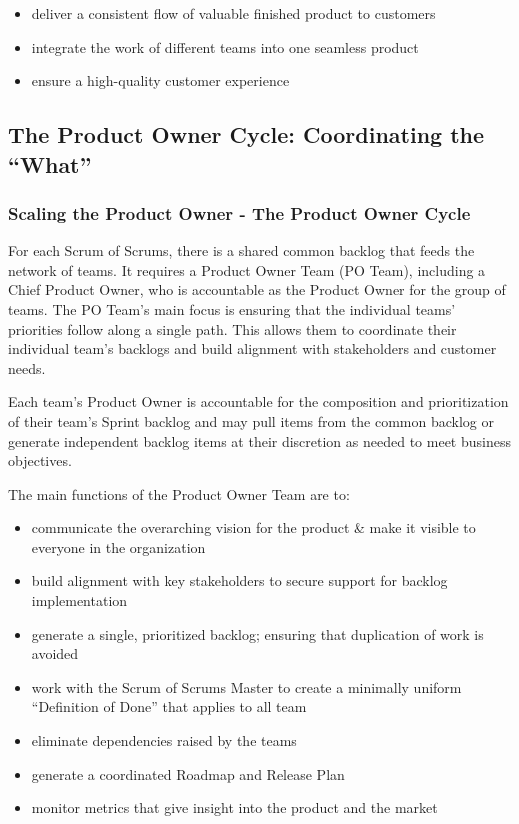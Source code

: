 \documentclass[12pt,a4paper,parskip=full]{scrartcl}
\begin{document}
\begin{itemize}
\itemsep1pt\parskip0pt
\item
  deliver a consistent flow of valuable finished product to customers
\item
  integrate the work of different teams into one seamless product
\item
  ensure a high-quality customer experience
\end{itemize}

\subsection{The Product Owner Cycle: Coordinating the
``What''}\label{The-product-owner-cycle}

\subsubsection{Scaling the Product Owner - The Product Owner
Cycle}\label{Scaling-the-product-owner}

For each Scrum of Scrums, there is a shared common backlog that feeds the network of teams. It requires a Product Owner Team (PO Team), including a Chief Product Owner, who is accountable as the Product Owner for the group of teams. The PO Team's main focus is ensuring that the individual teams' priorities follow along a single path. This allows them to coordinate their individual team's backlogs and build alignment with stakeholders and customer needs.


Each team's Product Owner is accountable for the composition and prioritization of their team's Sprint backlog and may pull items from the common backlog or generate independent backlog items at their discretion as needed to meet business objectives.

The main functions of the Product Owner Team are to:

\begin{itemize}
\itemsep1pt\parskip0pt
\item
  communicate the overarching vision for the product \& make it visible
  to everyone in the organization
\item
  build alignment with key stakeholders to secure support for backlog
  implementation
\item
  generate a single, prioritized backlog; ensuring that duplication of
  work is avoided
\item
  work with the Scrum of Scrums Master to create a minimally uniform
  ``Definition of Done'' that applies to all team
\item
  eliminate dependencies raised by the teams
\item
  generate a coordinated Roadmap and Release Plan
\item
  monitor metrics that give insight into the product and the market
\end{itemize}
\end{document}
